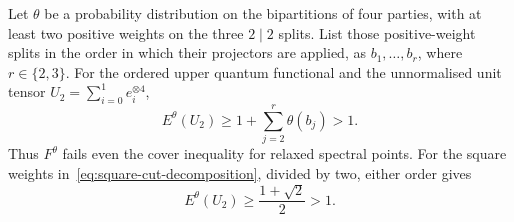 \begin{proposition}
\label{prop:square-upper-fails}
Let $\theta$ be a probability distribution on the bipartitions of four parties, with at least two positive weights on the three $2\mid2$ splits.  List those positive-weight splits in the order in which their projectors are applied, as $b_1,\ldots,b_r$, where $r\in\{2,3\}$.  For the ordered upper quantum functional and the unnormalised unit tensor $U_2=\sum_{i=0}^{1}e_i^{\otimes4}$,
\begin{equation}
 E^\theta(U_2)\geq 1+\sum_{j=2}^r\theta(b_j)>1.
 \label{eq:upper-square-failure}
\end{equation}
Thus $F^\theta$ fails even the cover inequality for relaxed spectral points.  For the square weights in~\eqref{eq:square-cut-decomposition}, divided by two, either order gives
\[
 E^\theta(U_2)\geq\frac{1+\sqrt2}{2}>1.
\]
\end{proposition}
